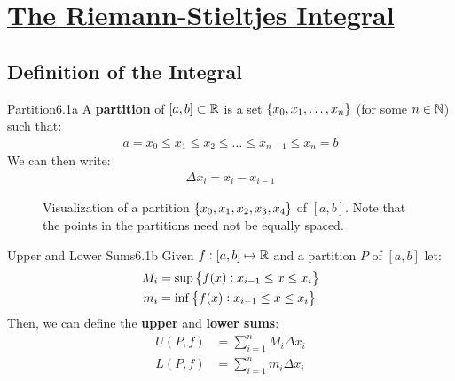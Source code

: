 \section[The Riemann-Stieltjes Integral]{\hyperlink{toc}{The Riemann-Stieltjes Integral}}

\subsection{Definition of the Integral}
\begin{definition}{Partition}{6.1a}
    A \textbf{partition} of $[a, b] \subset \mathbb{R}$ is a set $\set{x_0, x_1, \ldots, x_n}$ (for some $n \in \mathbb{N}$) such that:
    \begin{align*}
        a = x_0 \leq x_1 \leq x_2 \leq \ldots \leq x_{n-1} \leq x_n = b
    \end{align*}
    We can then write:
    \begin{align*}
        \Delta x_i = x_i - x_{i-1} 
    \end{align*}
\end{definition}

\begin{figure}[htbp]
    \centering
    \caption{Visualization of a partition $\set{x_0, x_1, x_2, x_3, x_4}$ of $[a, b]$. Note that the points in the partitions need not be equally spaced.}
    \label{fig27}
\end{figure}

\setcounter{rudin}{0}
\begin{definition}{Upper and Lower Sums}{6.1b}
    Given $f: [a, b] \mapsto \mathbb{R}$ and a partition $P$ of $[a, b]$ let:
    \begin{align*}
        M_i &= \sup\set{f(x): x_{i-1} \leq x \leq x_i}
        \\ m_i &= \inf\set{f(x): x_{i-1} \leq x \leq x_i}
    \end{align*}
    Then, we can define the \textbf{upper} and \textbf{lower sums}:
    \begin{align*}
        U(P, f) &= \sum_{i=1}^n M_i \Delta x_i
        \\ L(P, f) &= \sum_{i=1}^n m_i \Delta x_i
    \end{align*}
\end{definition}

